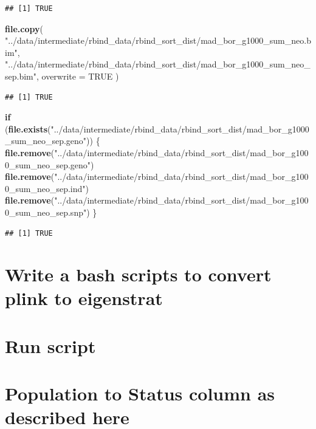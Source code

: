 \documentclass[
]{article}
\newenvironment{Shaded}{\begin{snugshade}}{\end{snugshade}}
\newcommand{\AttributeTok}[1]{\textcolor[rgb]{0.13,0.29,0.53}{#1}}
\newcommand{\ConstantTok}[1]{\textcolor[rgb]{0.56,0.35,0.01}{#1}}
\newcommand{\ControlFlowTok}[1]{\textcolor[rgb]{0.13,0.29,0.53}{\textbf{#1}}}
\newcommand{\FunctionTok}[1]{\textcolor[rgb]{0.13,0.29,0.53}{\textbf{#1}}}
\newcommand{\NormalTok}[1]{#1}
\newcommand{\StringTok}[1]{\textcolor[rgb]{0.31,0.60,0.02}{#1}}
\begin{document}
\begin{verbatim}
## [1] TRUE
\end{verbatim}

\begin{Shaded}
\begin{Highlighting}[]
\FunctionTok{file.copy}\NormalTok{(}
  \StringTok{"../data/intermediate/rbind\_data/rbind\_sort\_dist/mad\_bor\_g1000\_sum\_neo.bim"}\NormalTok{,}
  \StringTok{"../data/intermediate/rbind\_data/rbind\_sort\_dist/mad\_bor\_g1000\_sum\_neo\_sep.bim"}\NormalTok{,}
  \AttributeTok{overwrite =} \ConstantTok{TRUE}
\NormalTok{)}
\end{Highlighting}
\end{Shaded}

\begin{verbatim}
## [1] TRUE
\end{verbatim}

\begin{Shaded}
\begin{Highlighting}[]
\ControlFlowTok{if}\NormalTok{ (}\FunctionTok{file.exists}\NormalTok{(}\StringTok{"../data/intermediate/rbind\_data/rbind\_sort\_dist/mad\_bor\_g1000\_sum\_neo\_sep.geno"}\NormalTok{)) \{}
  \FunctionTok{file.remove}\NormalTok{(}\StringTok{"../data/intermediate/rbind\_data/rbind\_sort\_dist/mad\_bor\_g1000\_sum\_neo\_sep.geno"}\NormalTok{)}
  \FunctionTok{file.remove}\NormalTok{(}\StringTok{"../data/intermediate/rbind\_data/rbind\_sort\_dist/mad\_bor\_g1000\_sum\_neo\_sep.ind"}\NormalTok{)}
  \FunctionTok{file.remove}\NormalTok{(}\StringTok{"../data/intermediate/rbind\_data/rbind\_sort\_dist/mad\_bor\_g1000\_sum\_neo\_sep.snp"}\NormalTok{)}
\NormalTok{\}}
\end{Highlighting}
\end{Shaded}

\begin{verbatim}
## [1] TRUE
\end{verbatim}

\section{Write a bash scripts to convert plink to
eigenstrat}\label{write-a-bash-scripts-to-convert-plink-to-eigenstrat-1}

\section{Run script}\label{run-script-1}

\section{Population to Status column as described
here}\label{population-to-status-column-as-described-here}
\end{document}
